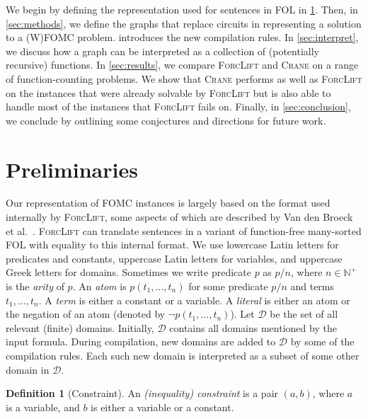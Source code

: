 \documentclass{article}
\theoremstyle{definition}
\newtheorem{definition}{Definition}
\begin{document}

We begin by defining the representation used for sentences in FOL in
\cref{sec:recprelims}. Then, in \cref{sec:methods}, we define the graphs that
replace circuits in representing a solution to a (W)FOMC problem.
 introduces the new compilation rules. In \cref{sec:interpret},
we discuss how a graph can be interpreted as a collection of (potentially
recursive) functions. In \cref{sec:results}, we compare \textsc{ForcLift} and
\textsc{Crane} on a range of function-counting problems. We show that
\textsc{Crane} performs as well as \textsc{ForcLift} on the instances that were
already solvable by \textsc{ForcLift} but is also able to handle most of the
instances that \textsc{ForcLift} fails on. Finally, in \cref{sec:conclusion}, we
conclude by outlining some conjectures and directions for future work.

\section{Preliminaries}\label{sec:recprelims}

Our representation of FOMC instances is largely based on the format used
internally by \textsc{ForcLift}, some aspects of which are described by Van den
Broeck et al.~. \textsc{ForcLift} can
translate sentences in a variant of function-free many-sorted FOL with equality
to this internal format. We use lowercase Latin letters for predicates and
constants, uppercase Latin letters for variables, and uppercase Greek letters
for domains. Sometimes we write predicate $p$ as $p/n$, where
$n \in \mathbb{N}^{+}$ is the \emph{arity} of $p$. An \emph{atom} is
$p(t_1, \dots, t_n)$ for some predicate $p/n$ and terms $t_{1}, \dots, t_{n}$. A
\emph{term} is either a constant or a variable. A \emph{literal} is either an
atom or the negation of an atom (denoted by $\neg p(t_1, \dots, t_n)$). Let
$\mathcal{D}$ be the set of all relevant (finite) domains. Initially,
$\mathcal{D}$ contains all domains mentioned by the input formula. During
compilation, new domains are added to $\mathcal{D}$ by some of the compilation
rules. Each such new domain is interpreted as a subset of some other domain in
$\mathcal{D}$.

\begin{definition}[Constraint]\label{def:constraint}
  An \emph{(inequality) constraint} is a pair $(a, b)$, where $a$ is a variable,
  and $b$ is either a variable or a constant.
\end{definition}
\end{document}
